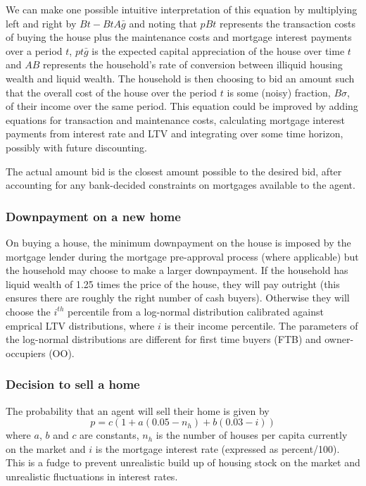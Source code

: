 \documentclass{report}
\begin{document}
We can make one possible intuitive interpretation of this equation by multiplying left and right by $Bt-BtA\bar{g}$ and noting that $pBt$ represents the transaction costs of buying the house plus the maintenance costs and mortgage interest payments over a period $t$, $pt\bar{g}$ is the expected capital appreciation of the house over time $t$ and $AB$ represents the household's rate of conversion between illiquid housing wealth and liquid wealth. The household is then choosing to bid an amount such that the overall cost of the house over the period $t$ is some (noisy) fraction, $B\sigma$, of their income over the same period. This equation could be improved by adding equations for transaction and maintenance costs, calculating mortgage interest payments from interest rate and LTV and integrating over some time horizon, possibly with future discounting.

The actual amount bid is the closest amount possible to the desired bid, after accounting for any bank-decided constraints on mortgages available to the agent.

\subsubsection{Downpayment on a new home}
\label{downpayment}
On buying a house, the minimum downpayment on the house is imposed by the mortgage lender during the mortgage pre-approval process (where applicable) but the household may choose to make a larger downpayment. If the household has liquid wealth of 1.25 times the price of the house, they will pay outright (this ensures there are roughly the right number of cash buyers). Otherwise they will choose the $i^{th}$ percentile from a log-normal distribution calibrated against emprical LTV distributions, where $i$ is their income percentile. The parameters of the log-normal distributions are different for first time buyers (FTB) and owner-occupiers (OO).

\subsubsection{Decision to sell a home}
The probability that an agent will sell their home is given by
\begin{equation}
p = c(1 + a(0.05-n_h) + b(0.03-i))
\label{sellhome}
\end{equation}
where $a$, $b$ and $c$ are constants, $n_h$ is the number of houses per capita currently on the market and $i$ is the mortgage interest rate (expressed as percent/100). This is a fudge to prevent unrealistic build up of housing stock on the market and unrealistic fluctuations in interest rates.
\end{document}
